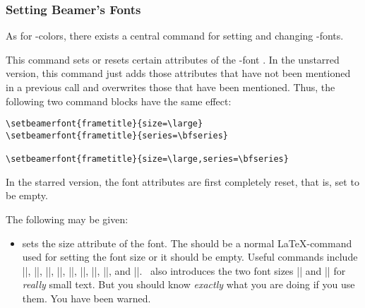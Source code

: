 \subsubsection{Setting Beamer's Fonts}

As for \beamer-colors, there exists a central command for setting and
changing \beamer-fonts.

\begin{command}{\setbeamerfont\opt{|*|}}
  This command sets or resets certain attributes of the \beamer-font . In the unstarred version, this command just adds those attributes that have not been mentioned in a previous call and overwrites those that have been mentioned. Thus, the following two command blocks have the same effect:

  \example
\begin{verbatim}
\setbeamerfont{frametitle}{size=\large}
\setbeamerfont{frametitle}{series=\bfseries}

\setbeamerfont{frametitle}{size=\large,series=\bfseries}
\end{verbatim}
  In the starred version, the font attributes are first completely reset, that is, set to be empty.

  The following  may be given:
  \begin{itemize}
  \item {} sets the size attribute of the \beamer font. The  should be a normal \LaTeX-command used for setting the font size or it should be empty. Useful commands include |\tiny|, |\scriptsize|, |\footnotesize|, |\small|, |\normalsize|, |\large|, |\Large|, |\huge|, and |\Huge|. \beamer\ also introduces the two font sizes |\Tiny| and |\TINY| for \emph{really} small text. But you should know \emph{exactly} what you are doing if you use them. You have been warned.


\end{itemize}
\end{command}
